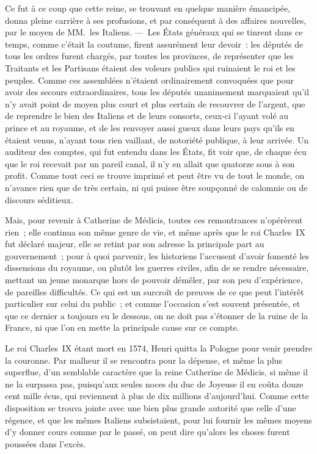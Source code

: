 \documentclass[french,twoside]{book} %
\begin{document}
Ce fut à ce coup que cette reine, se trouvant en quelque manière émancipée, donna pleine carrière à ses profusions, et par conséquent à des affaires nouvelles, par le moyen de MM. les Italiens. — Les États généraux qui se tinrent dans ce temps, comme c’était la coutume, firent assurément leur devoir : les députés de tous les ordres furent chargés, par toutes les provinces, de représenter que les Traitants et les Partisans étaient des voleurs publics qui ruinaient le roi et les peuples. Comme ces assemblées n’étaient ordinairement convoquées que pour avoir des secours extraordinaires, tous les députés unanimement marquaient qu’il n’y avait point de moyen plus court et plus certain de recouvrer de l’argent, que de reprendre le bien des Italiens et de leurs consorts, ceux-ci l’ayant volé au prince et au royaume, et de les renvoyer aussi gueux dans leurs pays qu’ils en étaient venus, n’ayant tous rien vaillant, de notoriété publique, à leur arrivée. Un auditeur des comptes, qui fut entendu dans les États, fit voir que, de chaque écu que le roi recevait par un pareil canal, il n’y en allait que quatorze sous à son profit. Comme tout ceci se trouve imprimé et peut être vu de tout le monde, on n’avance rien que de très certain, ni qui puisse être soupçonné de calomnie ou de discours séditieux.\par
Mais, pour revenir à Catherine de Médicis, toutes ces remontrances n’opérèrent rien ; elle continua son même genre de vie, et même après que le roi Charles IX fut déclaré majeur, elle se retint par son adresse la principale part au gouvernement ; pour à quoi parvenir, les historiens l’accusent d’avoir fomenté les dissensions du royaume, ou plutôt les guerres civiles, afin de se rendre nécessaire, mettant un jeune monarque hors de pouvoir démêler, par son peu d’expérience, de pareilles difficultés. Ce qui est un surcroît de preuves de ce que peut l’intérêt particulier sur celui du public ; et comme l’occasion s’est souvent présentée, et que ce dernier a toujours eu le dessous, on ne doit pas s’étonner de la ruine de la France, ni que l’on en mette la principale cause sur ce compte.\par
Le roi Charles IX étant mort en 1574, Henri quitta la Pologne pour venir prendre la couronne. Par malheur il se rencontra pour la dépense, et même la plus superflue, d’un semblable caractère que la reine Catherine de Médicis, si même il ne la surpassa pas, puisqu’aux seules noces du duc de Joyeuse il en coûta douze cent mille écus, qui reviennent à plus de dix millions d’aujourd’hui. Comme cette disposition se trouva jointe avec une bien plus grande autorité que celle d’une régence, et que les mêmes Italiens subsistaient, pour lui fournir les mêmes moyens d’y donner cours comme par le passé, on peut dire qu’alors les choses furent poussées dans l’excès.\par
\end{document}
